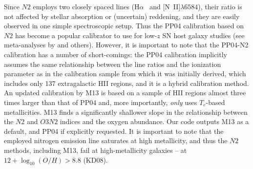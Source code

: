 \documentclass{emulateapj}
\newcommand{\oxabinline}{\ensuremath{12 + \log_{10}(O/H)}}
\newcommand{\ha}{\ensuremath{\mathrm{H}\alpha}}
\newcommand{\hb}{\ensuremath{\mathrm{H}\beta}}
\begin{document}



Since $N2$ employs two closely spaced lines (\ha~ and
[N~II]$\lambda6584$), their ratio is not affected by stellar
absorption or (uncertain) reddening, and they are easily observed in
one simple spectroscopic setup. Thus the PP04 calibration based on
$N2$ has become a popular calibrator to use for low-$z$ SN host galaxy
studies (see meta-analyses by
\citealt{sanders12,modjaz12_proc,leloudas14} and others). However, it
is important to note that the PP04-N2 calibration has a number of
short-comings: the PP04 calibration implicitly assumes the same
relationship between the line ratios and the ionization parameter as
in the calibration sample from which it was initially derived, which
includes only 137 extragalactic HII regions, and it is a hybrid
calibration method. An updated calibration by M13 is based on a sample
of HII regions almost three times larger than that of PP04 and, more
importantly, \emph{only} uses $T_e$-based metallicities. M13 finds a
significantly shallower slope in the relationship between the $N2$ and
$O3N2$ indices and the oxygen abundance. Our code outputs M13 as a
default, and PP04 if explicitly requested.  It is important to note
that the employed nitrogen emission line saturates at high
metallicity, and thus the $N2$ methods, including M13, fail at
high-metallicity galaxies -- at $\oxabinline > 8.8$ (KD08).
\end{document}
